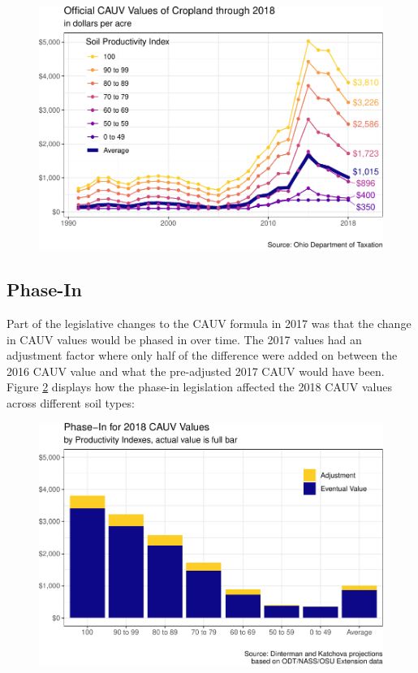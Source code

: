 \documentclass[]{article}
\begin{document}
\begin{figure}[H]
\includegraphics[width=1\linewidth]{4-projections-2019-2020_files/figure-latex/cropland-trend-1} \caption{\label{fig:cropland-trend}}\label{fig:cropland-trend}
\end{figure}

\hypertarget{phase-in}{%
\subsection{Phase-In}\label{phase-in}}

Part of the legislative changes to the CAUV formula in 2017 was that the
change in CAUV values would be phased in over time. The 2017 values had
an adjustment factor where only half of the difference were added on
between the 2016 CAUV value and what the pre-adjusted 2017 CAUV would
have been. Figure \ref{fig:phase-in} displays how the phase-in
legislation affected the 2018 CAUV values across different soil types:

\begin{figure}[H]
\includegraphics[width=1\linewidth]{4-projections-2019-2020_files/figure-latex/phase-in-1} \caption{\label{fig:phase-in}}\label{fig:phase-in}
\end{figure}
\end{document}
